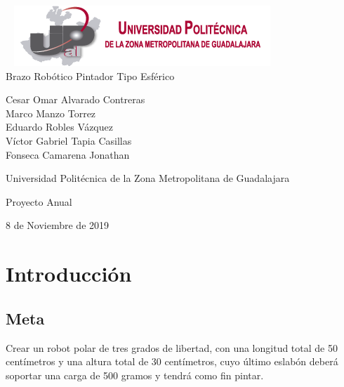 \documentclass[11pt,a4paper,oldfontcommands,oneside]{memoir}
\begin{document}
%
%
\thispagestyle{empty}

{%
\sffamily
\centering
\Large

~\vspace{\fill}
\includegraphics[scale=1]{Escudo.png} \\
{\huge 
\vspace{4cm}
Brazo Robótico Pintador Tipo Esférico 
}
\vspace{2.5cm}

{\LARGE
Cesar Omar Alvarado Contreras\\
Marco Manzo Torrez\\
Eduardo Robles Vázquez\\
Víctor Gabriel Tapia Casillas\\
Fonseca Camarena Jonathan
}

\vspace{2.5cm}

Universidad Politécnica de la Zona Metropolitana de Guadalajara

\vspace{3.5cm}

Proyecto Anual

\vspace{\fill}

8 de Noviembre de 2019

}%

\vspace{.5cm}
\hfill\break




\tableofcontents*

\clearpage


\chapter{Introducción}
\section{Meta}
Crear un robot polar de tres grados de libertad, con una longitud total de 50 centímetros y una altura total de 30 centímetros, cuyo último eslabón deberá soportar una carga de 500 gramos y tendrá como fin pintar.
\end{document}
